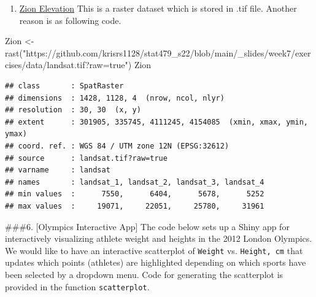 \documentclass[
]{article}
\newenvironment{Shaded}{\begin{snugshade}}{\end{snugshade}}
\newcommand{\FunctionTok}[1]{\textcolor[rgb]{0.00,0.00,0.00}{#1}}
\newcommand{\NormalTok}[1]{#1}
\newcommand{\OtherTok}[1]{\textcolor[rgb]{0.56,0.35,0.01}{#1}}
\newcommand{\StringTok}[1]{\textcolor[rgb]{0.31,0.60,0.02}{#1}}
\providecommand{\tightlist}{%
  \setlength{\itemsep}{0pt}\setlength{\parskip}{0pt}}
\begin{document}
\begin{enumerate}
\def\labelenumi{\alph{enumi}.}
\setcounter{enumi}{4}
\tightlist
\item
  \href{https://github.com/krisrs1128/stat479_s22/blob/main/_slides/week7/exercises/data/landsat.tif?raw=true}{Zion
  Elevation} This is a raster dataset which is stored in .tif file.
  Another reason is as following code.
\end{enumerate}

\begin{Shaded}
\begin{Highlighting}[]
\NormalTok{Zion }\OtherTok{\textless{}{-}} \FunctionTok{rast}\NormalTok{(}\StringTok{"https://github.com/krisrs1128/stat479\_s22/blob/main/\_slides/week7/exercises/data/landsat.tif?raw=true"}\NormalTok{)}
\NormalTok{Zion}
\end{Highlighting}
\end{Shaded}

\begin{verbatim}
## class       : SpatRaster 
## dimensions  : 1428, 1128, 4  (nrow, ncol, nlyr)
## resolution  : 30, 30  (x, y)
## extent      : 301905, 335745, 4111245, 4154085  (xmin, xmax, ymin, ymax)
## coord. ref. : WGS 84 / UTM zone 12N (EPSG:32612) 
## source      : landsat.tif?raw=true 
## varname     : landsat 
## names       : landsat_1, landsat_2, landsat_3, landsat_4 
## min values  :      7550,      6404,      5678,      5252 
## max values  :     19071,     22051,     25780,     31961
\end{verbatim}

\#\#\#6. {[}Olympics Interactive App{]} The code below sets up a Shiny
app for interactively visualizing athlete weight and heights in the 2012
London Olympics. We would like to have an interactive scatterplot of
\texttt{Weight} vs. \texttt{Height,\ cm} that updates which points
(athletes) are highlighted depending on which sports have been selected
by a dropdown menu. Code for generating the scatterplot is provided in
the function \texttt{scatterplot}.
\end{document}
